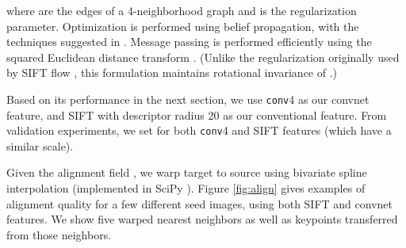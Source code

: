 \documentclass{article} \usepackage{nips14submit_e,times}
\begin{document}
where  are the edges of a 4-neighborhood graph and  is the
regularization parameter.
Optimization is performed using belief propagation, with the techniques
suggested in \cite{FHBP}.
Message passing is performed efficiently using the squared Euclidean distance
transform \cite{FHDT}.
(Unlike the  regularization originally used by SIFT flow \cite{sift-flow},
this formulation maintains rotational invariance of .)

Based on its performance in the next section, we use \texttt{conv}4 as our
convnet feature, and SIFT with descriptor radius 20 as our conventional feature.
From validation experiments, we set  for both
\texttt{conv}4 and SIFT features (which have a similar scale).

Given the alignment field , we warp target to source using bivariate spline
interpolation (implemented in SciPy \cite{scipy}).
Figure \ref{fig:align} gives examples of alignment quality for a few different
seed images, using both SIFT and convnet features.
We show five warped nearest neighbors as well as keypoints transferred
from those neighbors.
\end{document}

